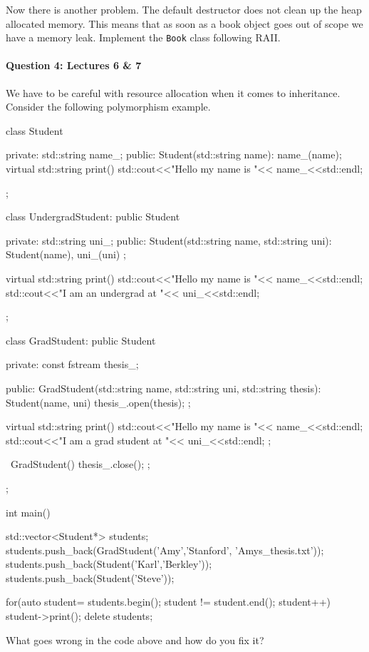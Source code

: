 \documentclass[12pt,letterpaper,twoside]{article}
\begin{document}
Now there is another problem. The default destructor does not clean up the heap allocated memory. This means that as soon as a book object goes out of scope we have a memory leak. Implement the \texttt{Book} class following RAII.

\paragraph{Question 4: Lectures 6 \& 7}
We have to be careful with resource allocation when it comes to inheritance. Consider the following polymorphism example.

\begin{cpp}
	class Student
	{
		private:
			std::string name_;
		public:
			Student(std::string name): name_(name){};
			virtual std::string print()
			{
				std::cout<<"Hello my name is "<< name_<<std::endl;
			}
		
	};
	
	class UndergradStudent: public Student
	{
		private:
		std::string uni_;
		public:
		Student(std::string name, std::string uni): Student(name), uni_(uni) {};
		
		virtual std::string print()
		{
			std::cout<<"Hello my name is "<< name_<<std::endl;
			std::cout<<"I am an undergrad at "<< uni_<<std::endl;
		}
		
	};
	
	class GradStudent: public Student
	{
		private:
		const fstream thesis_;
		
		public:
		GradStudent(std::string name, std::string uni, std::string thesis): 
		Student(name, uni)
		{
			thesis_.open(thesis);
		};
	
		virtual std::string print()
		{
			std::cout<<"Hello my name is "<< name_<<std::endl;
			std::cout<<"I am a grad student at "<< uni_<<std::endl;
		};
		
		~GradStudent(){
			thesis_.close();
		};	
	};
	
	int main()
	{
		std::vector<Student*> students;
		students.push_back(GradStudent('Amy','Stanford', 'Amys_thesis.txt'));
		students.push_back(Student('Karl','Berkley'));
		students.push_back(Student('Steve'));
		
		for(auto student= students.begin(); student != student.end(); student++)
		{
			student->print();
		}
		delete students;
	}
\end{cpp}

	What goes wrong in the code above and how do you fix it?
	
\end{document}
